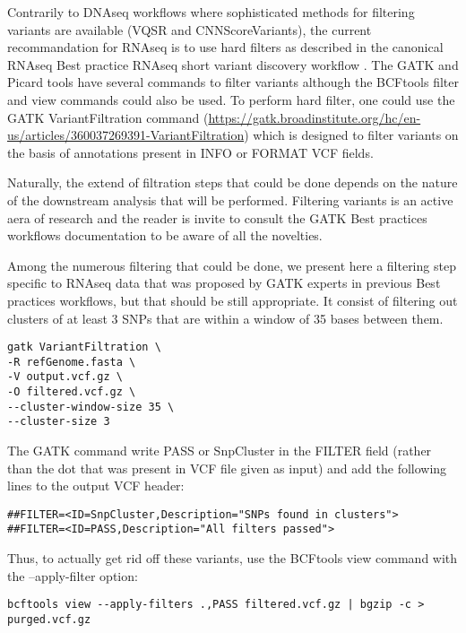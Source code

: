 Contrarily to DNAseq workflows where sophisticated methods for filtering variants are available (VQSR and CNNScoreVariants), the current recommandation for RNAseq is to use hard filters as described in the canonical RNAseq Best practice RNAseq short variant discovery workflow \cite{GATK_RNAseq_variant_discovery}. The GATK and Picard tools have several commands to filter variants although the BCFtools filter and view commands could also be used. To perform hard filter, one could use the GATK VariantFiltration command  (\href{https://gatk.broadinstitute.org/hc/en-us/articles/360037269391-VariantFiltration}{https://gatk.broadinstitute.org/hc/en-us/articles/360037269391-VariantFiltration}) which is designed to filter variants on the basis of annotations present in INFO or FORMAT VCF fields.

Naturally, the extend of filtration steps that could be done depends on the nature of the downstream analysis that will be performed. Filtering variants is an active aera of research and the reader is invite to consult the GATK Best practices workflows documentation to be aware of all the novelties.

Among the numerous filtering that could be done, we present here a filtering step specific to RNAseq data that was proposed by GATK experts in previous Best practices workflows, but that should be still appropriate. It consist of filtering out clusters of at least 3 SNPs that are within a window of 35 bases between them.


\begin{verbatim}
gatk VariantFiltration \
-R refGenome.fasta \
-V output.vcf.gz \
-O filtered.vcf.gz \
--cluster-window-size 35 \
--cluster-size 3
\end{verbatim}

The GATK command write PASS or SnpCluster in the FILTER field (rather than the dot that was present in VCF file given as input) and add the following lines to the output VCF header:

\begin{verbatim}
##FILTER=<ID=SnpCluster,Description="SNPs found in clusters">
##FILTER=<ID=PASS,Description="All filters passed">
\end{verbatim}


Thus, to actually get rid off these variants, use the BCFtools view command with the --apply-filter option:
\begin{verbatim}
bcftools view --apply-filters .,PASS filtered.vcf.gz | bgzip -c > purged.vcf.gz
\end{verbatim}


